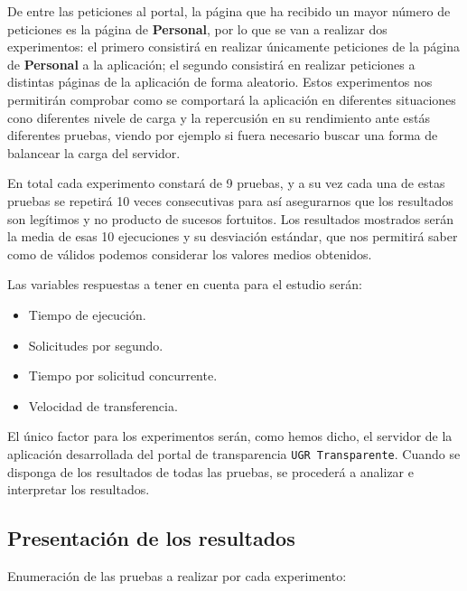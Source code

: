 \bigskip
De entre las peticiones al portal, la página que ha recibido un mayor número de peticiones es la página de \textbf{Personal}, por lo que se van a realizar dos experimentos: el primero consistirá en realizar únicamente peticiones de la página de \textbf{Personal} a la aplicación; el segundo consistirá en realizar peticiones a distintas páginas de la aplicación de forma aleatorio. Estos experimentos nos permitirán comprobar como se comportará la aplicación en diferentes situaciones cono diferentes nivele de carga y la repercusión en su rendimiento ante estás diferentes pruebas, viendo por ejemplo si fuera necesario buscar una forma de balancear la carga del servidor. 

\bigskip
En total cada experimento constará de 9 pruebas, y a su vez cada una de estas pruebas se repetirá 10 veces consecutivas para así asegurarnos que los resultados son legítimos y no producto de sucesos fortuitos. Los resultados mostrados serán la media de esas 10 ejecuciones y su desviación estándar, que nos permitirá saber como de válidos podemos considerar los valores medios obtenidos. 

\bigskip
Las variables respuestas a tener en cuenta para el estudio serán:

\begin{itemize}
	\item Tiempo de ejecución.
	\item Solicitudes por segundo.
	\item Tiempo por solicitud concurrente.
	\item Velocidad de transferencia.
\end{itemize}

\bigskip
El único factor para los experimentos serán, como hemos dicho, el servidor de la aplicación desarrollada del portal de transparencia {\tt UGR Transparente}. Cuando se disponga de los resultados de todas las pruebas, se procederá a analizar e interpretar los resultados.

\subsection{Presentación de los resultados}

Enumeración de las pruebas a realizar por cada experimento:

